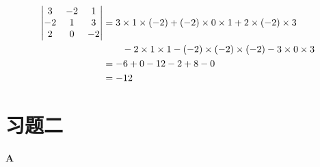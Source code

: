\begin{solution}
\[\begin{split}
  \begin{vmatrix}
    3&-2&1\\ -2&1&3\\2&0&-2
  \end{vmatrix}&=3\times1\times(-2)+(-2)\times0\times1+2\times(-2)\times3\\
  &\qquad 
  -2\times1\times1-(-2)\times(-2)\times(-2)-3\times0\times3\\
 & =-6+0-12-2+8-0\\
  &=-12
\end{split}\]
\end{solution}

\section*{习题二}
\begin{center}
  \bfseries A
\end{center}

